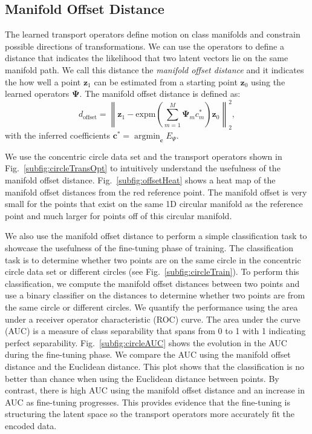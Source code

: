 \documentclass[letterpaper]{article} %
\newcommand{\mtx}[1]{\ensuremath{\mathbf{#1}}}
\newcommand{\vtr}[1]{\ensuremath{\mathbf{#1}}}
\newcommand{\argmin}{\mathop{\mathrm{argmin}}}
\begin{document}
\subsection{Manifold Offset Distance}\label{sec:distMet}
The learned transport operators define motion on class manifolds and constrain possible directions of transformations. We can use the operators to define a distance that indicates the likelihood that two latent vectors lie on the same manifold path. We call this distance the \textit{manifold offset distance} and it indicates the how well a point $\vtr{z}_1$ can be estimated from a starting point $\vtr{z}_0$ using the learned operators $\mtx{\Psi}$. The manifold offset distance is defined as:
\begin{equation}
d_{\mbox{offset}} = \left\|\vtr{z}_1 - \mathrm{expm}\left(\sum_{m=1}^M{\mtx{\Psi}_mc^*_{m}}\right)\vtr{z}_0\right\|_2^2,
\end{equation}
 with the inferred coefficients $\vtr{c}^* =  \argmin_\vtr{c}E_{\Psi}$.

We use the concentric circle data set and the transport operators shown in Fig.~\ref{subfig:circleTransOpt} to intuitively understand the usefulness of the manifold offset distance. Fig.~\ref{subfig:offsetHeat} shows a heat map of the manifold offset distances from the red reference point. The manifold offset is very small for the points that exist on the same 1D circular manifold as the reference point and much larger for points off of this circular manifold.


We also use the manifold offset distance to perform a simple classification task to showcase the usefulness of the fine-tuning phase of training. The classification task is to determine whether two points are on the same circle in the concentric circle data set or different circles (see Fig.~\ref{subfig:circleTrain}). To perform this classification, we compute the manifold offset distances between two points and use a binary classifier on the distances to determine whether two points are from the same circle or different circles. We quantify the performance using the area under a receiver operator characteristic (ROC) curve. The area under the curve (AUC) is a measure of class separability that spans from 0 to 1 with 1 indicating perfect separability. Fig.~\ref{subfig:circleAUC} shows the evolution in the AUC during the fine-tuning phase. We compare the AUC using the manifold offset distance and the Euclidean distance. This plot shows that the classification is no better than chance when using the Euclidean distance between points. By contrast, there is high AUC using the manifold offset distance and an increase in AUC as fine-tuning progresses. This provides evidence that the fine-tuning is structuring the latent space so the transport operators more accurately fit the encoded data.
\end{document}
